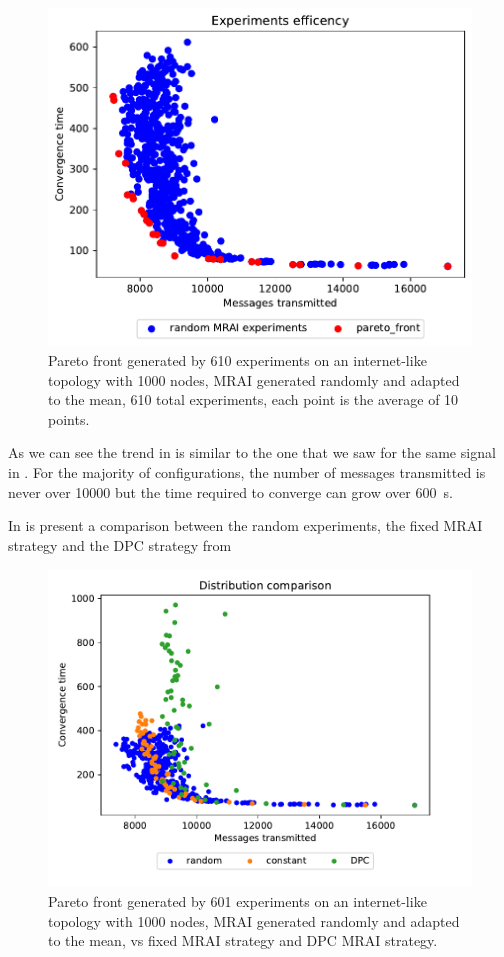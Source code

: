 \begin{figure}[h]
    \centering
    \includegraphics[width=.5\textwidth]{images/internet_like/1000/random.pdf}
	\caption{Pareto front generated by \num{610} experiments on an internet-like
	topology with \num{1000} nodes, \ac{MRAI} generated randomly and adapted to
		the mean, \num{610} total experiments, each point is the average of
		\num{10} points.}
    \label{fig:random_pareto_front}
\end{figure}

As we can see the trend in  is similar to the one
that we saw for the same signal in .
For the majority of configurations, the number of messages transmitted is never
over \num{10000} but the time required to converge can grow over \SI{600}{\second}.

In  is present a comparison between the random
experiments, the fixed \ac{MRAI} strategy and the \ac{DPC} strategy from

\begin{figure}[h]
    \centering
    \includegraphics[width=.57\textwidth]{images/internet_like/1000/random_vs_all.pdf}
	\caption{Pareto front generated by \num{601} experiments on an internet-like
	topology with \num{1000} nodes, \ac{MRAI} generated randomly and adapted to
	the mean, vs fixed \ac{MRAI} strategy and \ac{DPC} \ac{MRAI} strategy.
	}
    \label{fig:pareto_comparison}
\end{figure}

